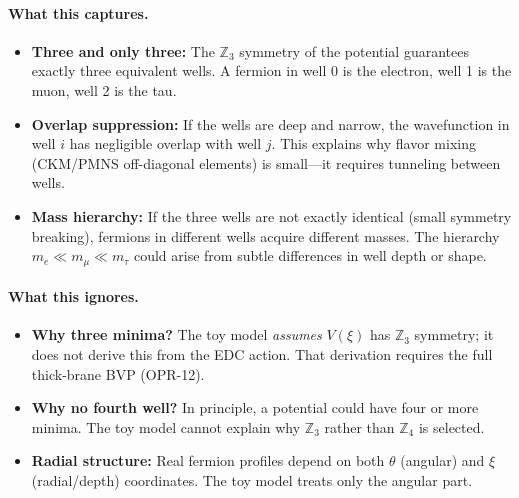 \paragraph{What this captures.}
\begin{itemize}[nosep]
    \item \textbf{Three and only three:} The $\mathbb{Z}_3$ symmetry of the
          potential guarantees exactly three equivalent wells. A fermion in
          well 0 is the electron, well 1 is the muon, well 2 is the tau.
    \item \textbf{Overlap suppression:} If the wells are deep and narrow,
          the wavefunction in well $i$ has negligible overlap with well $j$.
          This explains why flavor mixing (CKM/PMNS off-diagonal elements)
          is small---it requires tunneling between wells.
    \item \textbf{Mass hierarchy:} If the three wells are not exactly
          identical (small symmetry breaking), fermions in different wells
          acquire different masses. The hierarchy $m_e \ll m_\mu \ll m_\tau$
          could arise from subtle differences in well depth or shape.
\end{itemize}

\paragraph{What this ignores.}
\begin{itemize}[nosep]
    \item \textbf{Why three minima?} The toy model \emph{assumes} $V(\xi)$
          has $\mathbb{Z}_3$ symmetry; it does not derive this from the
          EDC action. That derivation requires the full thick-brane BVP
          (OPR-12).
    \item \textbf{Why no fourth well?} In principle, a potential could have
          four or more minima. The toy model cannot explain why $\mathbb{Z}_3$
          rather than $\mathbb{Z}_4$ is selected.
    \item \textbf{Radial structure:} Real fermion profiles depend on both
          $\theta$ (angular) and $\xi$ (radial/depth) coordinates. The toy model
          treats only the angular part.
\end{itemize}

